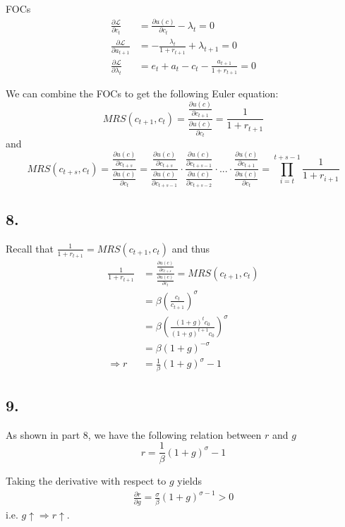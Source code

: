 \documentclass[12pt]{article}
\theoremstyle{definition}
\begin{document}
FOCs
\[
\begin{split}
\frac{\partial \mathcal{L}}{\partial c_t} &= \frac{\partial u(c)}{\partial c_t}-\lambda_t = 0 \\
\frac{\partial \mathcal{L}}{\partial a_{t+1}} &= -\frac{\lambda_t}{1+r_{t+1}} + \lambda_{t+1} = 0 \\
\frac{\partial \mathcal{L}}{\partial \lambda_t} &= e_t+a_{t}-c_t-\frac{a_{t+1}}{1+r_{t+1}} = 0
\end{split}
\]

We can combine the FOCs to get the following Euler equation:
\[
\boxed{
	MRS(c_{t+1},c_t)=\frac{\frac{\partial u(c)}{\partial c_{t+1}}}{\frac{\partial u(c)}{\partial c_{t}}}=\frac{1}{1+r_{t+1}}
}
\]
and 
\[
\boxed{
	MRS(c_{t+s},c_t)=\frac{\frac{\partial u(c)}{\partial c_{t+s}}}{\frac{\partial u(c)}{\partial c_{t}}}= \frac{\frac{\partial u(c)}{\partial c_{t+s}}}{\frac{\partial u(c)}{\partial c_{t+s-1}}} \cdot \frac{\frac{\partial u(c)}{\partial c_{t+s-1}}}{\frac{\partial u(c)}{\partial c_{t+s-2}}} \cdot ... \cdot  \frac{\frac{\partial u(c)}{\partial c_{t+1}}}{\frac{\partial u(c)}{\partial c_{t}}}= \prod_{i=t}^{t+s-1} \frac{1}{1+r_{i+1}}
}
\]
\subsection*{8.}
Recall that $\frac{1}{1+r_{t+1}} =MRS(c_{t+1},c_t)$ and thus
\[
\begin{split}
	\frac{1}{1+r_{t+1}} & =\frac{\frac{\partial u(c)}{\partial c_{t+s}}}{\frac{\partial u(c)}{\partial c_{t}}} =MRS(c_{t+1},c_t)\\
	& =  \beta \left(\frac{c_t}{c_{t+1}}\right)^\sigma\\
	& = \beta \left(\frac{(1+g)^tc_0}{(1+g)^{t+1}c_0}\right)^\sigma \\
	& = \beta (1+g)^{-\sigma} \\
	\Rightarrow r & = \frac{1}{\beta}(1+g)^\sigma-1
\end{split}
\]

\subsection*{9.}

As shown in part 8, we have the following relation between $r$ and $g$
\[
r  = \frac{1}{\beta}(1+g)^\sigma-1
\]

Taking the derivative with respect to $g$ yields
\[
\begin{split}
 \frac{\partial r}{\partial g}  =  \frac{\sigma}{\beta} (1+g)^{\sigma-1}>0
\end{split}
\]
i.e. $g \uparrow \Rightarrow r \uparrow$.
\end{document}
